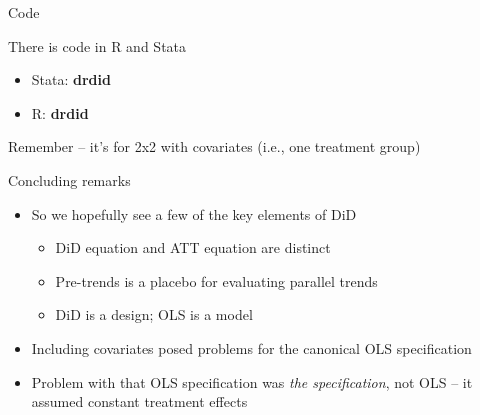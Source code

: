 \documentclass{beamer}
\begin{document}
\begin{frame}{Code}

There is code in R and Stata
\begin{itemize}
\item Stata: \textbf{drdid}
\item R: \textbf{drdid}
\end{itemize}
\bigskip
Remember -- it's for 2x2 with covariates (i.e., one treatment group)

\end{frame}




\begin{frame}{Concluding remarks}

\begin{itemize}
\item So we hopefully see a few of the key elements of DiD
	\begin{itemize}
	\item DiD equation and ATT equation are distinct
	\item Pre-trends is a placebo for evaluating parallel trends
	\item DiD is a design; OLS is a model
	\end{itemize}
\item Including covariates posed problems for the canonical OLS specification
\item Problem with that OLS specification was \emph{the specification}, not OLS -- it assumed constant treatment effects
\end{itemize}

\end{frame}
\end{document}
